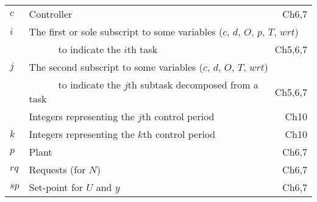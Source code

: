 {\begin{longtable}{llr}
$c$ & Controller & Ch6,7\\
$i$ & \multicolumn{2}{l}{The first or sole subscript to some variables ($c$, $d$, $O$, $p$, $T$, $wrt$)}\\
    & ~~~~~~to indicate  the $i$th task & Ch5,6,7\\
$j$ & \multicolumn{2}{l}{The second subscript to some variables ($c$, $d$, $O$, $T$, $wrt$)}\\
    & ~~~~~~to indicate the $j$th subtask decomposed from a task & Ch5,6,7\\ 
 & Integers representing the $j$th control period & Ch10\\
$k$  & Integers representing the $k$th control period & Ch10\\
$p$ & Plant & Ch6,7\\
$rq$ & Requests (for $N$) & Ch6,7\\
$sp$ & Set-point for $U$ and $y$ & Ch6,7\\
\end{longtable}
}

